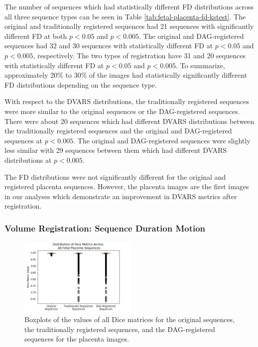 The number of sequences which had statistically different FD distributions across all three sequence types can be seen in Table \ref{tab:fetal-placenta-fd-kstest}. The original and traditionally registered sequences had 21 sequences with significantly different FD at both $p < 0.05$ and $p < 0.005$. The original and DAG-registered sequences had 32 and 30 sequences with statistically different FD at $p < 0.05$ and $p < 0.005$, respectively. The two types of registration have 31 and 20 sequences with statistically different FD at $p < 0.05$ and $p < 0.005$. To summarize, approximately 20\% to 30\% of the images had statistically significantly different FD distributions depending on the sequence type.

With respect to the DVARS distributions, the traditionally registered sequences were more similar to the original sequences or the DAG-registered sequences. There were about 20 sequences which had different DVARS distributions between the traditionally registered sequences and the original and DAG-registered sequences at $p < 0.005$. The original and DAG-registered sequences were slightly less similar with 29 sequences between them which had different DVARS distributions at $p < 0.005$.

The FD distributions were not significantly different for the original and registered placenta sequences. However, the placenta images are the first images in our analyses which demonstrate an improvement in DVARS metrics after registration.

\subsubsection{Volume Registration: Sequence Duration Motion}

\begin{figure}
\centering
\includegraphics[width=0.5\textwidth]{6/figures/fetal-placenta-dice-box.png}
\caption{Boxplots of the values of all Dice matrices for the original sequences, the traditionally registered sequences, and the DAG-registered sequences for the placenta images.}
\label{fig:fetal-placenta-dice-box}
\end{figure}

